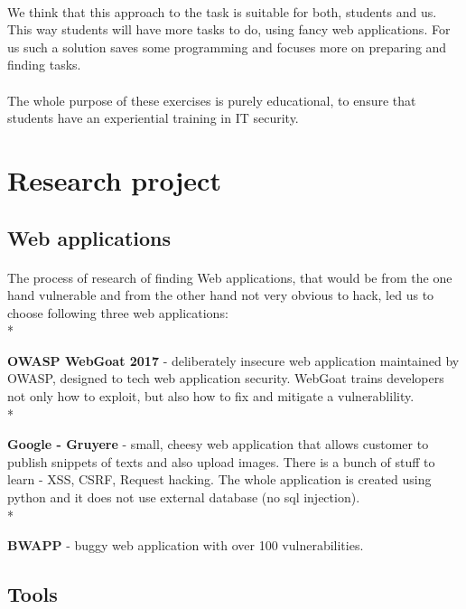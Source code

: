 \documentclass[12pt, a4paper]{article}
\begin{document}
\paragraph{}We think that this approach to the task is suitable for both, students and us. This way students will have more tasks to do, using fancy web applications. For us such a solution saves some programming and focuses more on preparing and finding tasks.

\paragraph{}The whole purpose of these exercises is purely educational, to ensure that students have an experiential training in IT security.

\section{Research project}
\subsection{Web applications}
\paragraph{}The process of research of finding Web applications, that would be from the one hand vulnerable and from the other hand not very obvious to hack, led us to choose following three web applications:\\*

\textbullet{} \textbf{OWASP WebGoat 2017} - deliberately insecure web application maintained by OWASP, designed to tech web application security. WebGoat trains developers not only how to exploit, but also how to fix and mitigate a vulnerablility.\\*

\textbullet{} \textbf{Google - Gruyere} - small, cheesy web application that allows customer to publish snippets of texts and also upload images. There is a bunch of stuff to learn - XSS, CSRF, Request hacking. The whole application is created using python and it does not use external database (no sql injection).\\*

\textbullet{} \textbf{BWAPP} - buggy web application with over 100 vulnerabilities.\\

\subsection{Tools}
\end{document}
